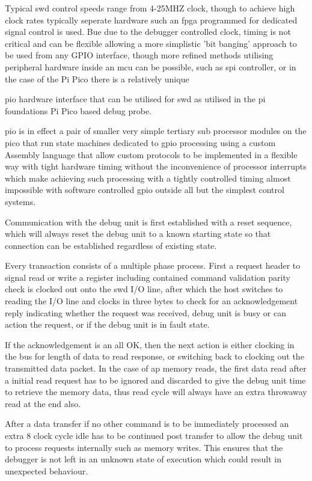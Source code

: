 Typical \gls{swd} control speeds range from 4-25MHZ clock, though to achieve high clock rates typically seperate hardware such an \gls{fpga} programmed for dedicated signal control is used. Bue due to the debugger controlled clock, timing is not critical and can be flexible allowing a more simplistic 'bit banging' approach to be used from any GPIO interface, though more refined methods utilising peripheral hardware inside an \gls{mcu} can be possible, such as \gls{spi} controller, or in the case of the Pi Pico there is a relatively unique {\gls{pio} hardware interface that can be utilised for \gls{swd} as utilised in the pi foundations Pi Pico based debug probe.

\gls{pio} is in effect a pair of smaller very simple tertiary sub processor modules on the pico that run state machines dedicated to \gls{gpio} processing using a custom Assembly language that allow custom protocols to be implemented in a flexible way with tight hardware timing without the inconvenience of processor interrupts which make achieving such processing with a tightly controlled timing almost impossible with software controlled \gls{gpio} outside all but the simplest control systems.


Communication with the debug unit is first established with a reset sequence, which will always reset the debug unit to a known starting state so that connection can be established regardless of existing state.

Every transaction consists of a multiple phase process. First a request header to signal read or write a register including contained command validation parity check is clocked out onto the \gls{swd} I/O line, after which the host switches to reading the I/O line and clocks in three bytes to check for an acknowledgement reply indicating whether the request was received, debug unit is busy or can action the request, or if the debug unit is in fault state.

If the acknowledgement is an all OK, then the next action is either clocking in the bus for length of data to read response, or switching back to clocking out the transmitted data packet. In the case of \gls{ap} memory reads, the first data read after a initial read request has to be ignored and discarded to give the debug unit time to retrieve the memory data, thus read cycle will always have an extra throwaway read at the end also.

After a data transfer if no other command is to be immediately processed an extra 8 clock cycle idle has to be continued post transfer to allow the debug unit to process requests internally such as memory writes. This ensures that the debugger is not left in an unknown state of execution which could result in unexpected behaviour.

}

